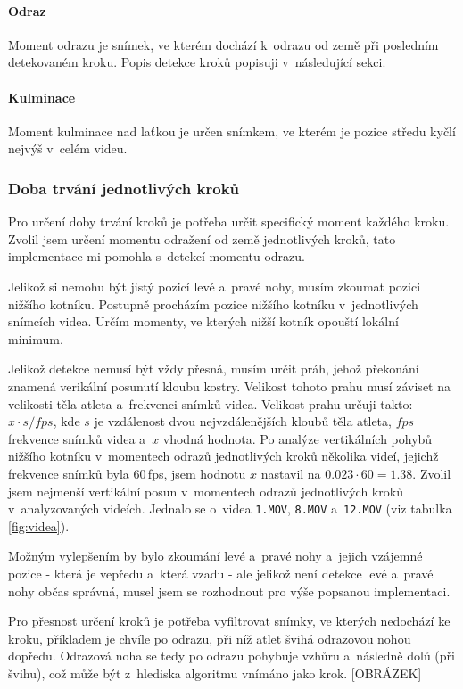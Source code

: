 \paragraph{Odraz}

Moment odrazu je snímek, ve kterém dochází k~odrazu od země při posledním detekovaném kroku. Popis detekce kroků popisuji v~následující sekci.

\paragraph{Kulminace}

Moment kulminace nad laťkou je určen snímkem, ve kterém je pozice středu kyčlí nejvýš v~celém videu.


\subsubsection{Doba trvání jednotlivých kroků}

Pro určení doby trvání kroků je potřeba určit specifický moment každého kroku. Zvolil jsem určení momentu odražení od země jednotlivých kroků, tato implementace mi pomohla s~detekcí momentu odrazu.

Jelikož si nemohu být jistý pozicí levé a~pravé nohy, musím zkoumat pozici nižšího kotníku. Postupně procházím pozice nižšího kotníku v~jednotlivých snímcích videa. Určím momenty, ve kterých nižší kotník opouští lokální minimum.

Jelikož detekce nemusí být vždy přesná, musím určit práh, jehož překonání znamená verikální posunutí kloubu kostry. Velikost tohoto prahu musí záviset na velikosti těla atleta a~frekvenci snímků videa. Velikost prahu určuji takto: $x\cdot s/fps$, kde $s$ je vzdálenost dvou nejvzdálenějších kloubů těla atleta, $fps$ frekvence snímků videa a~$x$ vhodná hodnota. Po analýze vertikálních pohybů nižšího kotníku v~momentech odrazů jednotlivých kroků několika videí, jejichž frekvence snímků byla $60$\,\rm fps, jsem hodnotu $x$ nastavil na $0.023\cdot 60=1.38$. Zvolil jsem nejmenší vertikální posun v~momentech odrazů jednotlivých kroků v~analyzovaných videích. Jednalo se o~videa \texttt{1.MOV}, \texttt{8.MOV} a~\texttt{12.MOV} (viz tabulka \ref{fig:videa}).

Možným vylepšením by bylo zkoumání levé a~pravé nohy a~jejich vzájemné pozice - která je vepředu a~která vzadu - ale jelikož není detekce levé a~pravé nohy občas správná, musel jsem se rozhodnout pro výše popsanou implementaci.

Pro přesnost určení kroků je potřeba vyfiltrovat snímky, ve kterých nedochází ke kroku, příkladem je chvíle po odrazu, při níž atlet švihá odrazovou nohou dopředu. Odrazová noha se tedy po odrazu pohybuje vzhůru a~následně dolů (při švihu), což může být z~hlediska algoritmu vnímáno jako krok. [OBRÁZEK]

